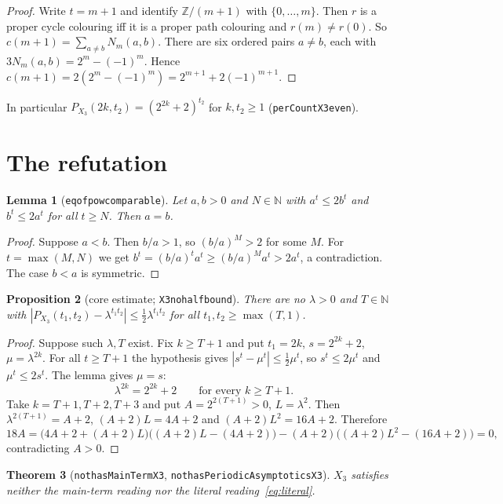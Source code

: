 \documentclass[11pt]{article}
\newtheorem{theorem}{Theorem}
\newtheorem{lemma}[theorem]{Lemma}
\newtheorem{proposition}[theorem]{Proposition}
\theoremstyle{definition}
\theoremstyle{remark}
\renewcommand{\_}{\oldus\allowbreak}
\newcommand{\Z}{\mathbb{Z}}
\newcommand{\N}{\mathbb{N}}
\newcommand{\lean}[1]{\texttt{#1}}
\begin{document}
\begin{proof}
Write $t=m+1$ and identify $\Z/(m+1)$ with $\{0,\dots,m\}$. Then $r$ is a proper cycle colouring iff
it is a proper path colouring and $r(m)\neq r(0)$. So $c(m+1)=\sum_{a\neq b}N_m(a,b)$. There are six
ordered pairs $a\neq b$, each with $3N_m(a,b)=2^m-(-1)^m$. Hence $c(m+1)=2(2^m-(-1)^m)=2^{m+1}+2(-1)^{m+1}$.
\end{proof}

In particular $P_{X_3}(2k,t_2)=(2^{2k}+2)^{t_2}$ for $k,t_2\ge1$ (\lean{perCount\_X3\_even}).

\section{The refutation}

\begin{lemma}[\lean{eq\_of\_pow\_comparable}]
Let $a,b>0$ and $N\in\N$ with $a^t\le 2b^t$ and $b^t\le2a^t$ for all $t\ge N$. Then $a=b$.
\end{lemma}

\begin{proof}
Suppose $a<b$. Then $b/a>1$, so $(b/a)^M>2$ for some $M$. For $t=\max(M,N)$ we get
$b^t=(b/a)^ta^t\ge(b/a)^Ma^t>2a^t$, a contradiction. The case $b<a$ is symmetric.
\end{proof}

\begin{proposition}[core estimate; \lean{X3\_no\_half\_bound}]\label{prop:core}
There are no $\lambda>0$ and $T\in\N$ with
$|P_{X_3}(t_1,t_2)-\lambda^{t_1t_2}|\le\frac12\lambda^{t_1t_2}$ for all $t_1,t_2\ge\max(T,1)$.
\end{proposition}

\begin{proof}
Suppose such $\lambda,T$ exist. Fix $k\ge T+1$ and put $t_1=2k$, $s=2^{2k}+2$, $\mu=\lambda^{2k}$. For
all $t\ge T+1$ the hypothesis gives $|s^t-\mu^t|\le\frac12\mu^t$, so $s^t\le2\mu^t$ and
$\mu^t\le2s^t$. The lemma gives $\mu=s$:
\[
  \lambda^{2k}=2^{2k}+2\qquad\text{for every }k\ge T+1.
\]
Take $k=T+1,T+2,T+3$ and put $A=2^{2(T+1)}>0$, $L=\lambda^2$. Then $\lambda^{2(T+1)}=A+2$,
$(A+2)L=4A+2$ and $(A+2)L^2=16A+2$. Therefore
\[
  18A=\bigl(4A+2+(A+2)L\bigr)\bigl((A+2)L-(4A+2)\bigr)-(A+2)\bigl((A+2)L^2-(16A+2)\bigr)=0,
\]
contradicting $A>0$.
\end{proof}

\begin{theorem}[\lean{not\_hasMainTerm\_X3}, \lean{not\_hasPeriodicAsymptotics\_X3}]\label{thm:x3}
$X_3$ satisfies neither the main-term reading nor the literal reading~\eqref{eq:literal}.
\end{theorem}
\end{document}
